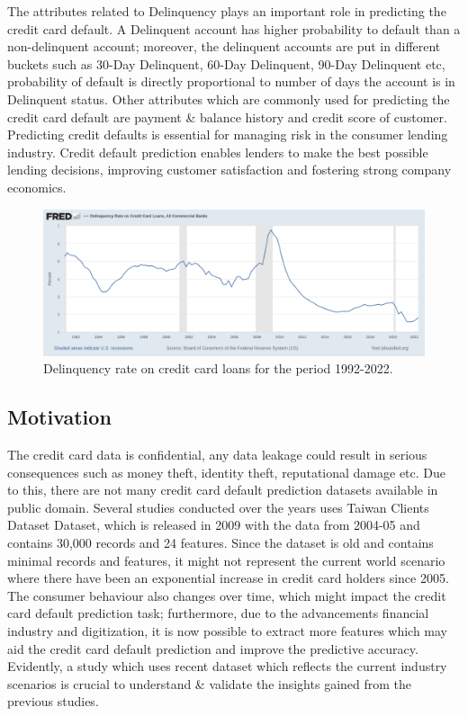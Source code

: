 \documentclass[twoside,11pt,a4paper]{article}
\begin{document}
The attributes related to Delinquency plays an important role in predicting the credit card default. A Delinquent account has higher probability to default than a non-delinquent account; moreover, the delinquent accounts are put in different buckets such as 30-Day Delinquent, 60-Day Delinquent, 90-Day Delinquent etc, probability of default is directly proportional to number of days the account is in Delinquent status. Other attributes which are commonly used for predicting the credit card default are payment \& balance history and credit score of customer.\\

Predicting credit defaults is essential for managing risk in the consumer lending industry. Credit default prediction enables lenders to make the best possible lending decisions, improving customer satisfaction and fostering strong company economics. \\

\begin{figure}[ht]
	\centering
	\includegraphics[width=1.0\textwidth]{fredgraph}
	\caption[Delinquency rate on credit card loans for the period 1992-2022]{Delinquency rate on credit card loans for the period 1992-2022{\citep{fedgraph_delinquency_history}}.}
	\label{fig:fredgraph}
\end{figure}
\FloatBarrier
\subsection{Motivation}
The credit card data is confidential, any data leakage could result in serious consequences such as money theft, identity theft, reputational damage etc. Due to this, there are not many credit card default prediction datasets available in public domain. Several studies conducted over the years uses Taiwan Clients Dataset \citep{yeh2009comparisons} Dataset, which is released in 2009 with the data from 2004-05 and contains 30,000 records and 24 features. Since the dataset is old and contains minimal records and features, it might not represent the current world scenario where there have been an exponential increase in credit card holders since 2005. The consumer behaviour also changes over time, which might impact the credit card default prediction task; furthermore, due to the advancements financial industry and digitization, it is now possible to extract more features which may aid the credit card default prediction and improve the predictive accuracy. Evidently, a study which uses recent dataset which reflects the current industry scenarios is crucial to understand \& validate the insights gained from the previous studies.\\
\end{document}
